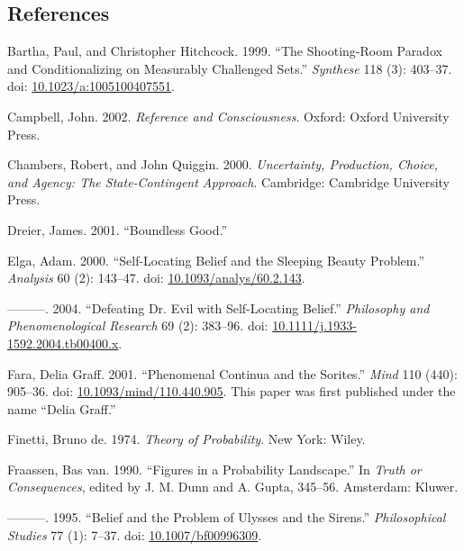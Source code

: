 \documentclass[
  11pt,
  letterpaper,
  DIV=11,
  numbers=noendperiod,
  twoside]{scrartcl}
\newlength{\cslhangindent}
\newenvironment{CSLReferences}[2] %
 {\begin{list}{}{%
  \setlength{\itemindent}{0pt}
  \setlength{\leftmargin}{0pt}
  \setlength{\parsep}{0pt}
  \ifodd #1
   \setlength{\leftmargin}{\cslhangindent}
   \setlength{\itemindent}{-1\cslhangindent}
  \fi
  \setlength{\itemsep}{#2\baselineskip}}}
 {\end{list}}
\begin{document}
\subsection*{References}\label{references}

\label{refs}
\begin{CSLReferences}{1}{0}
Bartha, Paul, and Christopher Hitchcock. 1999. {``The Shooting-Room
Paradox and Conditionalizing on Measurably Challenged Sets.''}
\emph{Synthese} 118 (3): 403--37. doi:
\href{https://doi.org/10.1023/a:1005100407551}{10.1023/a:1005100407551}.

Campbell, John. 2002. \emph{Reference and Consciousness}. Oxford: Oxford
University Press.

Chambers, Robert, and John Quiggin. 2000. \emph{Uncertainty, Production,
Choice, and Agency: The State-Contingent Approach}. Cambridge: Cambridge
University Press.

Dreier, James. 2001. {``Boundless Good.''}

Elga, Adam. 2000. {``Self-Locating Belief and the Sleeping Beauty
Problem.''} \emph{Analysis} 60 (2): 143--47. doi:
\href{https://doi.org/10.1093/analys/60.2.143}{10.1093/analys/60.2.143}.

---------. 2004. {``Defeating Dr. Evil with Self-Locating Belief.''}
\emph{Philosophy and Phenomenological Research} 69 (2): 383--96. doi:
\href{https://doi.org/10.1111/j.1933-1592.2004.tb00400.x}{10.1111/j.1933-1592.2004.tb00400.x}.

Fara, Delia Graff. 2001. {``Phenomenal Continua and the Sorites.''}
\emph{Mind} 110 (440): 905--36. doi:
\href{https://doi.org/10.1093/mind/110.440.905}{10.1093/mind/110.440.905}.
This paper was first published under the name {``Delia Graff.''}

Finetti, Bruno de. 1974. \emph{Theory of Probability}. New York: Wiley.

Fraassen, Bas van. 1990. {``Figures in a Probability Landscape.''} In
\emph{Truth or Consequences}, edited by J. M. Dunn and A. Gupta,
345--56. Amsterdam: Kluwer.

---------. 1995. {``Belief and the Problem of Ulysses and the Sirens.''}
\emph{Philosophical Studies} 77 (1): 7--37. doi:
\href{https://doi.org/10.1007/bf00996309}{10.1007/bf00996309}.


\end{CSLReferences}
\end{document}
